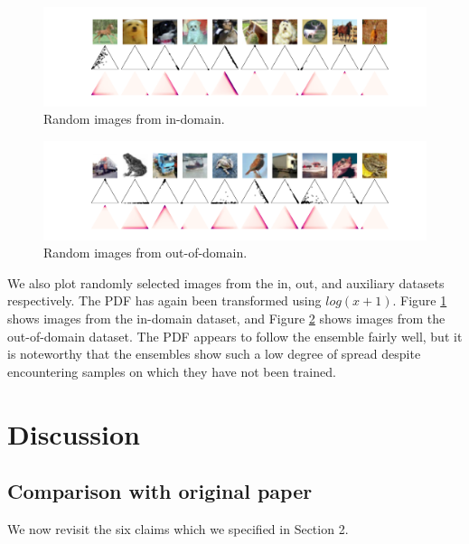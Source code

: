 \begin{figure}[H]
    \centering
    \includegraphics[trim = 0 0 0 20, clip, width = 1\linewidth]{../openreview/plots/simplex_in.png}
    \caption{Random images from in-domain.}
    \label{fig:simplex_in}
\end{figure}

\begin{figure}[H]
    \centering
    \includegraphics[trim = 0 0 0 20, clip, width = 1\linewidth]{../openreview/plots/simplex_out.png}
    \caption{Random images from out-of-domain.}
    \label{fig:simplex_out}
\end{figure}

We also plot randomly selected images from the in, out, and auxiliary datasets respectively. The PDF has again been transformed using $log(x + 1)$. Figure \ref{fig:simplex_in} shows images from the in-domain dataset, and Figure \ref{fig:simplex_out} shows images from the out-of-domain dataset. The PDF appears to follow the ensemble fairly well, but it is noteworthy that the ensembles show such a low degree of spread despite encountering samples on which they have not been trained. 




\section{Discussion}
\label{sec:discussion}

\subsection{Comparison with original paper}

We now revisit the six claims which we specified in Section 2.

